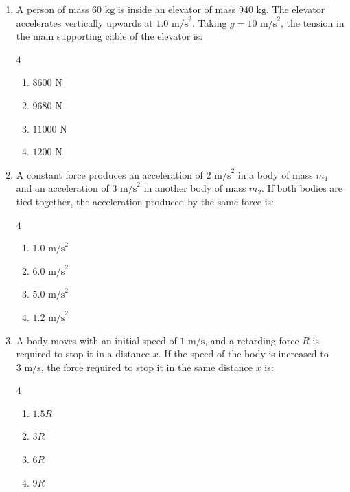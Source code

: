 \documentclass[11pt,a4paper]{article}
\begin{document}
\begin{enumerate}[label=\textbf{\arabic*.},leftmargin=18pt,itemsep=8pt]
  \item A person of mass $60\text{ kg}$ is inside an elevator of mass $940\text{ kg}$. The elevator accelerates vertically upwards at $1.0\text{ m/s}^2$. Taking $g = 10\text{ m/s}^2$, the tension in the main supporting cable of the elevator is:
  \begin{multicols}{4}
    \begin{enumerate}[label=(\Alph*)]
      \item $8600\text{ N}$
      \item $9680\text{ N}$
      \item $11000\text{ N}$
      \item $1200\text{ N}$
    \end{enumerate}
  \end{multicols}

  \item A constant force produces an acceleration of $2\text{ m/s}^2$ in a body of mass $m_1$ and an acceleration of $3\text{ m/s}^2$ in another body of mass $m_2$. If both bodies are tied together, the acceleration produced by the same force is:
  \begin{multicols}{4}
    \begin{enumerate}[label=(\Alph*)]
      \item $1.0\text{ m/s}^2$
      \item $6.0\text{ m/s}^2$
      \item $5.0\text{ m/s}^2$
      \item $1.2\text{ m/s}^2$
    \end{enumerate}
  \end{multicols}

  \item A body moves with an initial speed of $1\text{ m/s}$, and a retarding force $R$ is required to stop it in a distance $x$. If the speed of the body is increased to $3\text{ m/s}$, the force required to stop it in the same distance $x$ is:
  \begin{multicols}{4}
    \begin{enumerate}[label=(\Alph*)]
      \item $1.5 R$
      \item $3 R$
      \item $6 R$
      \item $9 R$
    \end{enumerate}
  \end{multicols}


\end{enumerate}
\end{document}

